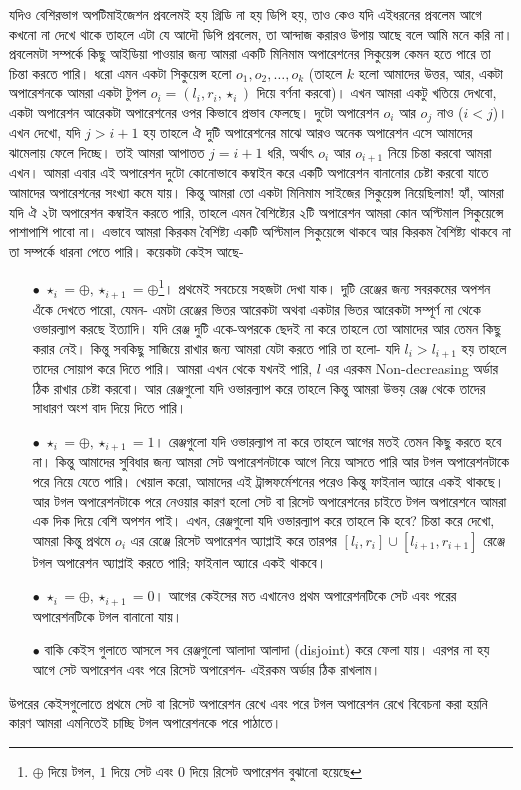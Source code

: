 \begin{solution}
যদিও বেশিরভাগ অপটিমাইজেশন প্রবলেমই হয় গ্রিডি না হয় ডিপি হয়, তাও কেও যদি এইধরনের প্রবলেম আগে কখনো না দেখে থাকে তাহলে এটা যে আদৌ ডিপি প্রবলেম, তা আন্দাজ করারও উপায় আছে বলে আমি মনে করি না। প্রবলেমটা সম্পর্কে কিছু আইডিয়া পাওয়ার জন্য আমরা একটি মিনিমাম অপারেশনের সিকুয়েন্স কেমন হতে পারে তা চিন্তা করতে পারি। ধরো এমন একটা সিকুয়েন্স হলো $o_1, o_2, \ldots, o_k$ (তাহলে $k$ হলো আমাদের উত্তর, আর, একটা অপারেশনকে আমরা একটা টুপল $o_i = (l_i, r_i, \star_i)$ দিয়ে বর্ণনা করবো)।  এখন আমরা একটু খতিয়ে দেখবো, একটা অপারেশন আরেকটা অপারেশনের ওপর কিভাবে প্রভাব ফেলছে। দুটো অপারেশন $o_i$ আর $o_j$ নাও ($i < j$)। এখন দেখো, যদি $j > i+1$ হয় তাহলে ঐ দুটি অপারেশনের মাঝে আরও অনেক অপারেশন এসে আমাদের ঝামেলায় ফেলে দিচ্ছে। তাই আমরা আপাতত $j=i+1$ ধরি, অর্থাৎ $o_i$ আর $o_{i+1}$ নিয়ে চিন্তা করবো আমরা এখন। আমরা এবার এই অপারেশন দুটো কোনোভাবে কম্বাইন করে একটি অপারেশন বানানোর চেষ্টা করবো যাতে আমাদের অপারেশনের সংখ্যা কমে যায়। কিন্তু আমরা তো একটা মিনিমাম সাইজের সিকুয়েন্স নিয়েছিলাম! হ্যাঁ, আমরা যদি ঐ ২টা অপারেশন কম্বাইন করতে পারি, তাহলে এমন বৈশিষ্ট্যের ২টি অপারেশন আমরা কোন অপ্টিমাল সিকুয়েন্সে  পাশাপাশি পাবো না। এভাবে আমরা কিরকম বৈশিষ্ট্য একটি অপ্টিমাল সিকুয়েন্সে থাকবে আর কিরকম বৈশিষ্ট্য থাকবে না তা সম্পর্কে ধারনা পেতে পারি। কয়েকটা কেইস আছে-
\begin{itemize}
  \item[$\bullet$] $\star_i = \oplus, \star_{i+1} = \oplus$\footnote{$\oplus$ দিয়ে টগল, $1$ দিয়ে সেট এবং $0$ দিয়ে রিসেট অপারেশন বুঝানো হয়েছে}। প্রথমেই সবচেয়ে সহজটা দেখা যাক। দুটি রেঞ্জের জন্য সবরকমের অপশন এঁকে দেখতে পারো, যেমন- এমটা রেঞ্জের ভিতর আরেকটা অথবা একটার ভিতর আরেকটা সম্পূর্ণ না থেকে ওভারল্যাপ করছে ইত্যাদি। যদি রেঞ্জ দুটি একে-অপরকে  ছেদই না করে তাহলে তো আমাদের আর তেমন কিছু করার নেই। কিন্তু সবকিছু সাজিয়ে রাখার জন্য আমরা যেটা করতে পারি তা হলো- যদি $l_i > l_{i+1}$ হয় তাহলে তাদের সোয়াপ করে দিতে পারি। আমরা এখন থেকে যখনই পারি, $l$ এর এরকম Non-decreasing অর্ডার ঠিক রাখার চেষ্টা করবো। আর রেঞ্জগুলো যদি ওভারল্যাপ করে তাহলে কিন্তু আমরা উভয় রেঞ্জ থেকে তাদের সাধারণ অংশ বাদ দিয়ে দিতে পারি।
  \item[$\bullet$] $\star_i = \oplus, \star_{i+1} = 1$।  রেঞ্জগুলো যদি ওভারল্যাপ না করে তাহলে আগের মতই তেমন কিছু করতে হবে না। কিন্তু আমাদের সুবিধার জন্য আমরা সেট অপারেশনটাকে আগে নিয়ে আসতে পারি আর টগল অপারেশনটাকে পরে নিয়ে যেতে পারি। খেয়াল করো, আমাদের এই ট্রান্সফর্মেশনের পরেও কিন্তু ফাইনাল অ্যারে একই থাকছে। আর টগল অপারেশনটাকে পরে নেওয়ার কারণ হলো সেট বা রিসেট অপারেশনের চাইতে টগল অপারেশনে আমরা এক দিক দিয়ে বেশি অপশন পাই। এখন, রেঞ্জগুলো যদি ওভারল্যাপ করে তাহলে কি হবে? চিন্তা করে দেখো, আমরা কিন্তু প্রথমে $o_i$ এর রেঞ্জে রিসেট অপারেশন অ্যাপ্লাই করে তারপর $[l_i, r_i] \cup [l_{i+1}, r_{i+1}]$ রেঞ্জে টগল অপারেশন অ্যাপ্লাই করতে পারি; ফাইনাল অ্যারে একই থাকবে।
  \item[$\bullet$] $\star_i = \oplus, \star_{i+1} = 0$। আগের কেইসের মত এখানেও প্রথম অপারেশনটিকে সেট এবং পরের অপারেশনটিকে টগল বানানো যায়।
  \item[$\bullet$] বাকি কেইস গুলাতে আসলে সব রেঞ্জগুলো আলাদা আলাদা (disjoint) করে ফেলা যায়। এরপর না হয় আগে সেট অপারেশন এবং পরে রিসেট অপারেশন- এইরকম অর্ডার ঠিক রাখলাম।
\end{itemize}
উপরের কেইসগুলোতে প্রথমে সেট বা রিসেট অপারেশন রেখে এবং পরে টগল অপারেশন রেখে বিবেচনা করা হয়নি কারণ আমরা এমনিতেই চাচ্ছি টগল অপারেশনকে পরে পাঠাতে।


\end{solution}
